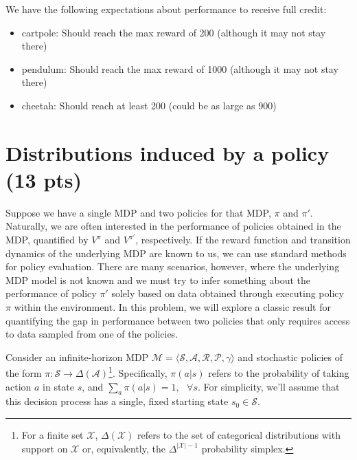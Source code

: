 \documentclass{article}
\begin{document}
\begin{enumerate}
We have the following expectations about performance to receive full credit:
\begin{itemize}
    \item cartpole: Should reach the max reward of 200 (although it may not stay there)
    \item pendulum: Should reach the max reward of 1000 (although it may not stay there)
    \item cheetah: Should reach at least 200 (could be as large as 900)
\end{itemize}
\end{enumerate}

\newpage
\section{Distributions induced by a policy (13 pts)}

Suppose we have a single MDP and two policies for that MDP, $\pi$ and $\pi'$. Naturally, we are often interested in the performance of policies obtained in the MDP, quantified by $V^{\pi}$ and $V^{\pi'}$, respectively. If the reward function and transition dynamics of the underlying MDP are known to us, we can use standard methods for policy evaluation. There are many scenarios, however, where the underlying MDP model is not known and we must try to infer something about the performance of policy $\pi'$ solely based on data obtained through executing policy $\pi$ within the environment. In this problem, we will explore a classic result for quantifying the gap in performance between two policies that only requires access to data sampled from one of the policies. 

Consider an infinite-horizon MDP $\mathcal{M} = \langle \mathcal{S}, \mathcal{A}, \mathcal{R}, \mathcal{P}, \gamma \rangle$ and stochastic policies of the form $\pi: \mathcal{S} \rightarrow \Delta(\mathcal{A})$\footnote{For a finite set $\mathcal{X}$, $\Delta(\mathcal{X})$ refers to the set of categorical distributions with support on $\mathcal{X}$ or, equivalently, the $\Delta^{|\mathcal{X}|-1}$ probability simplex.}. Specifically, $\pi(a|s)$ refers to the probability of taking action $a$ in state $s$, and $\sum_a \pi(a|s) = 1, \text{ } \forall s$. For simplicity, we'll assume that this decision process has a single, fixed starting state $s_{0} \in \mathcal{S}$. 
\end{document}
